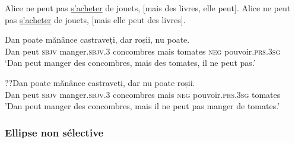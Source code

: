 \ea \label{ch1:ex76}
\ea  Alice ne peut pas \uline{s’acheter} de jouets, [mais des livres, elle peut]. \citep{BusquetsEtAl2001} \label{ch1:ex76a} 
\ex  *Alice ne peut pas \uline{s’acheter} de jouets, [mais elle peut des livres]. \citep{Dagnac2008} \label{ch1:ex76b}
\z
\z

\ea \label{ch1:ex77}
\ea
\gll   Dan  poate  mănânce  castraveți,  dar  roșii,  nu  poate.\\
Dan  peut  \textsc{sbjv}  manger.\textsc{sbjv.3}  concombres  mais  tomates  \textsc{neg}  pouvoir.\textsc{prs.3sg}\\
\glt ‘Dan peut manger des concombres, mais des tomates, il ne peut pas.’ 

\ex
\gll  ??Dan  poate  mănânce castraveți,  dar  nu  poate  roșii.\\
    Dan  peut  \textsc{sbjv}  manger.\textsc{sbjv.3}  concombres  mais  \textsc{neg}  pouvoir.\textsc{prs.3sg}  tomates\\
\glt 'Dan peut manger des concombres, mais il ne peut pas manger de tomates.’ 
\z
\z

\subsubsection{Ellipse non sélective} \label{ch1:sect1.4.1.3}

